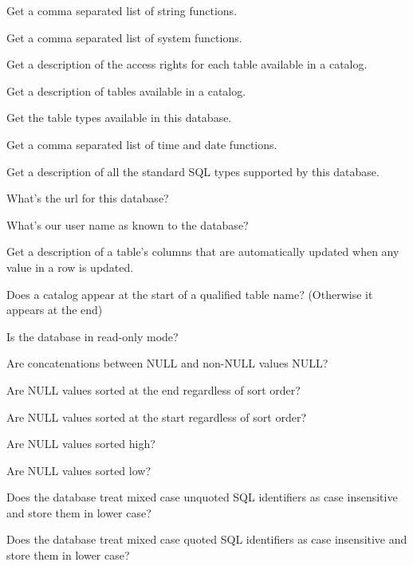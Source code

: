 \begin{description}
Get a comma separated list of string functions. 

Get a comma separated list of system functions. 

Get a description of the access rights for each table available in a catalog. 

Get a description of tables available in a catalog. 

Get the table types available in this database. 

Get a comma separated list of time and date functions. 

Get a description of all the standard SQL types supported by this database. 

What's the url for this database? 

What's our user name as known to the database? 

Get a description of a table's columns that are automatically updated when any value in a row is updated. 

Does a catalog appear at the start of a qualified table name? (Otherwise it appears at the end) 

Is the database in read-only mode? 

Are concatenations between NULL and non-NULL values NULL?

Are NULL values sorted at the end regardless of sort order? 

Are NULL values sorted at the start regardless of sort order? 

Are NULL values sorted high? 

Are NULL values sorted low? 

Does the database treat mixed case unquoted SQL identifiers as case insensitive and store them in lower case? 

Does the database treat mixed case quoted SQL identifiers as case insensitive and store them in lower case? 


\end{description}
